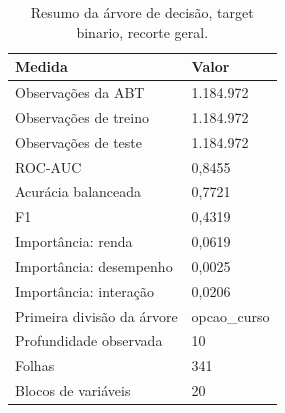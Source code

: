 \begin{table}
\caption{Resumo da árvore de decisão, target binario, recorte geral.}
\label{tab:tabela_treeClassification_binario_recorte_geral_principal_in_sample_e5}
\begin{tabular}{ll}
\toprule
Medida & Valor \\
\midrule
Observações da ABT & 1.184.972 \\
Observações de treino & 1.184.972 \\
Observações de teste & 1.184.972 \\
ROC-AUC & 0,8455 \\
Acurácia balanceada & 0,7721 \\
F1 & 0,4319 \\
Importância: renda & 0,0619 \\
Importância: desempenho & 0,0025 \\
Importância: interação & 0,0206 \\
Primeira divisão da árvore & opcao\_curso \\
Profundidade observada & 10 \\
Folhas & 341 \\
Blocos de variáveis & 20 \\
\bottomrule
\end{tabular}
\end{table}
